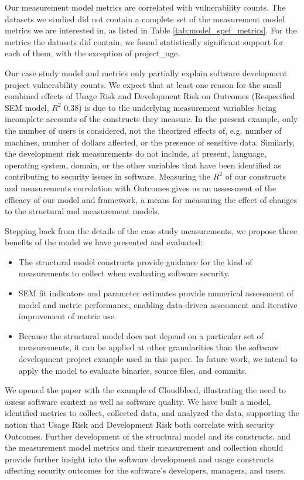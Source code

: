 Our measurement model metrics are correlated with vulnerability counts. The datasets we studied did not contain a complete set of the measurement model metrics we are interested in, as listed in Table \ref{tab:model_spef_metrics}. For the metrics the datasets did contain, we found statistically significant support for each of them, with the exception of project\_age. 

Our case study model and metrics only partially explain software development project vulnerability counts.  We expect that at least one reason for the small combined effects of Usage Risk and Development Risk on Outcomes (Respecified SEM model, $R^2$ 0.38) is due to the underlying measurement variables being incomplete accounts of the constructs they measure. In the present example, only the number of users is considered, not the theorized effects of, e.g. number of machines, number of dollars affected, or the presence of sensitive data. Similarly, the development risk measurements do not include, at present, language, operating system, domain, or the other variables that have been identified as contributing to security issues in software. Measuring the $R^2$ of our constructs and measurements correlation with Outcomes gives us an assessment of the efficacy of our model and framework, a means for measuring the effect of changes to the structural and measurement models.

Stepping back from the details of the case study measurements, we propose three benefits of the model we have presented and evaluated: 
\begin{itemize}
\item The structural model constructs provide guidance for the kind of measurements to collect when evaluating software security.
\item SEM fit indicators and parameter estimates provide numerical assessment of model and metric performance, enabling data-driven assessment and iterative improvement of metric use.
\item Because the structural model does not depend on a particular set of measurements, it can be applied at other granularities than the software development project example used in this paper. In future work, we intend to apply the model to evaluate binaries, source files, and commits.
\end{itemize}

We opened the paper with the example of Cloudbleed, illustrating the need to assess software context as well as software quality. We have built a model, identified metrics to collect, collected data, and analyzed the data, supporting the notion that Usage Risk and Development Risk both  correlate with security Outcomes. Further development of the structural model and its constructs, and the measurement model metrics and their measurement and collection should provide further insight into the software development and usage constructs affecting security outcomes for the software's developers, managers, and users.
